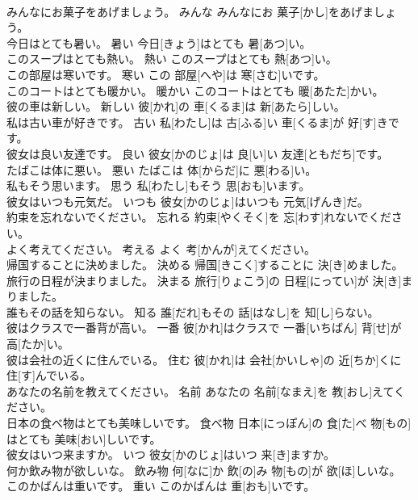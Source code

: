 \documentclass[8pt]{extreport}
\begin{document}
\begin{CJK}{UTF8}{min}
\\	みんなにお菓子をあげましょう。	みんな	みんなにお 菓子[かし]をあげましょう。	
\\	今日はとても暑い。	暑い	今日[きょう]はとても 暑[あつ]い。	
\\	このスープはとても熱い。	熱い	このスープはとても 熱[あつ]い。	
\\	この部屋は寒いです。	寒い	この 部屋[へや]は 寒[さむ]いです。	
\\	このコートはとても暖かい。	暖かい	このコートはとても 暖[あたた]かい。	
\\	彼の車は新しい。	新しい	彼[かれ]の 車[くるま]は 新[あたら]しい。	
\\	私は古い車が好きです。	古い	私[わたし]は 古[ふる]い 車[くるま]が 好[す]きです。	
\\	彼女は良い友達です。	良い	彼女[かのじょ]は 良[い]い 友達[ともだち]です。	
\\	たばこは体に悪い。	悪い	たばこは 体[からだ]に 悪[わる]い。	
\\	私もそう思います。	思う	私[わたし]もそう 思[おも]います。	
\\	彼女はいつも元気だ。	いつも	彼女[かのじょ]はいつも 元気[げんき]だ。	
\\	約束を忘れないでください。	忘れる	約束[やくそく]を 忘[わす]れないでください。	
\\	よく考えてください。	考える	よく 考[かんが]えてください。	
\\	帰国することに決めました。	決める	帰国[きこく]することに 決[き]めました。	
\\	旅行の日程が決まりました。	決まる	旅行[りょこう]の 日程[にってい]が 決[き]まりました。	
\\	誰もその話を知らない。	知る	誰[だれ]もその 話[はなし]を 知[し]らない。	
\\	彼はクラスで一番背が高い。	一番	彼[かれ]はクラスで 一番[いちばん] 背[せ]が 高[たか]い。	
\\	彼は会社の近くに住んでいる。	住む	彼[かれ]は 会社[かいしゃ]の 近[ちか]くに 住[す]んでいる。	
\\	あなたの名前を教えてください。	名前	あなたの 名前[なまえ]を 教[おし]えてください。	
\\	日本の食べ物はとても美味しいです。	食べ物	日本[にっぽん]の 食[た]べ 物[もの]はとても 美味[おい]しいです。	
\\	彼女はいつ来ますか。	いつ	彼女[かのじょ]はいつ 来[き]ますか。	
\\	何か飲み物が欲しいな。	飲み物	何[なに]か 飲[の]み 物[もの]が 欲[ほ]しいな。	
\\	このかばんは重いです。	重い	このかばんは 重[おも]いです。	

\end{CJK}
\end{document}
